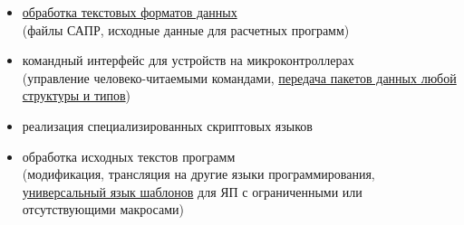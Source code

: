 
\begin{itemize}[nosep]
\item \underline{обработка текстовых форматов данных}\\
(файлы САПР, исходные данные для расчетных программ)
\item командный интерфейс для устройств на микроконтроллерах\\
(управление человеко-читаемыми командами, \underline{передача пакетов данных
любой структуры и типов})
\item реализация специализированных скриптовых языков
\item обработка исходных текстов программ\\
(модификация, трансляция на другие языки программирования,\\ 
\underline{универсальный язык шаблонов}
для ЯП с ограниченными или отсутствующими макросами)
\end{itemize}